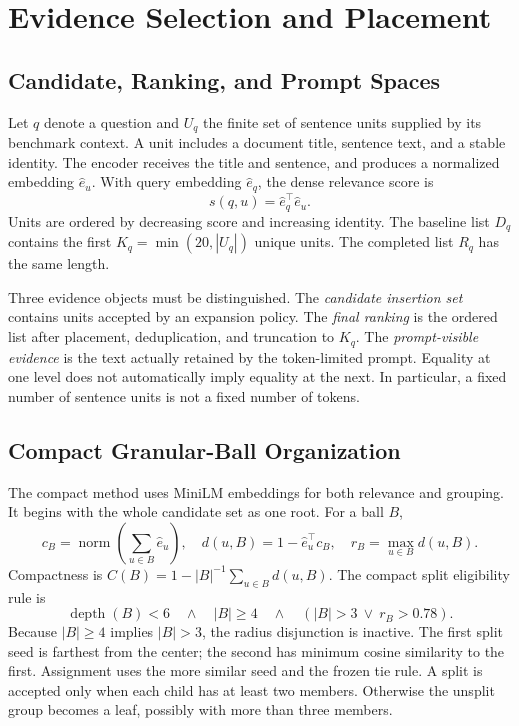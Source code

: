 \documentclass[11pt,a4paper]{article}
\begin{document}
\section{Evidence Selection and Placement}
\subsection{Candidate, Ranking, and Prompt Spaces}
Let $q$ denote a question and $U_q$ the finite set of sentence units supplied
by its benchmark context. A unit includes a document title, sentence text,
and a stable identity. The encoder receives the title and sentence, and
produces a normalized embedding $\hat e_u$. With query embedding $\hat e_q$,
the dense relevance score is
\begin{equation}
s(q,u)=\hat e_q^\top\hat e_u.
\end{equation}
Units are ordered by decreasing score and increasing identity. The baseline
list $D_q$ contains the first $K_q=\min(20,|U_q|)$ unique units.
The completed list $R_q$ has the same length.

Three evidence objects must be distinguished. The \emph{candidate insertion
set} contains units accepted by an expansion policy. The \emph{final ranking}
is the ordered list after placement, deduplication, and truncation to $K_q$.
The \emph{prompt-visible evidence} is the text actually retained by the
token-limited prompt. Equality at one level does not automatically imply
equality at the next. In particular, a fixed number of sentence units is not
a fixed number of tokens.

\subsection{Compact Granular-Ball Organization}
The compact method uses MiniLM embeddings for both relevance and grouping.
It begins with the whole candidate set as one root. For a ball $B$,
\begin{equation}
c_B=\operatorname{norm}\left(\sum_{u\in B}\hat e_u\right),\quad
d(u,B)=1-\hat e_u^\top c_B,\quad r_B=\max_{u\in B}d(u,B).
\end{equation}
Compactness is $C(B)=1-|B|^{-1}\sum_{u\in B}d(u,B)$.
The compact split eligibility rule is
\begin{equation}
\operatorname{depth}(B)<6\quad\land\quad |B|\geq4
\quad\land\quad (|B|>3\ \lor\ r_B>0.78).
\label{eq:split}
\end{equation}
Because $|B|\geq4$ implies $|B|>3$, the radius disjunction is inactive.
The first split seed is farthest from the center; the second has minimum
cosine similarity to the first. Assignment uses the more similar seed and
the frozen tie rule. A split is accepted only when each child has at least
two members. Otherwise the unsplit group becomes a leaf, possibly with more
than three members.
\end{document}
